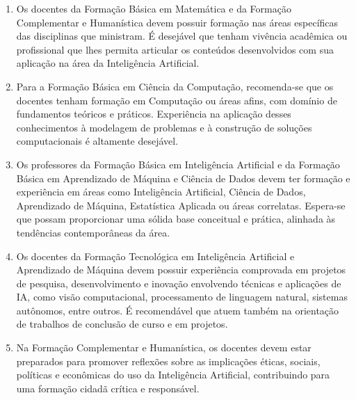 \begin{enumerate}
    \item Os docentes da Formação Básica em Matemática e da Formação Complementar e Humanística devem possuir formação nas áreas específicas das disciplinas que ministram. É desejável que tenham vivência acadêmica ou profissional que lhes permita articular os conteúdos desenvolvidos com sua aplicação na área da Inteligência Artificial.

    \item Para a Formação Básica em Ciência da Computação, recomenda-se que os docentes tenham formação em Computação ou áreas afins, com domínio de fundamentos teóricos e práticos. Experiência na aplicação desses conhecimentos à modelagem de problemas e à construção de soluções computacionais é altamente desejável.

    \item Os professores da Formação Básica em Inteligência Artificial e da Formação Básica em Aprendizado de Máquina e Ciência de Dados devem ter formação e experiência em áreas como Inteligência Artificial, Ciência de Dados, Aprendizado de Máquina, Estatística Aplicada ou áreas correlatas. Espera-se que possam proporcionar uma sólida base conceitual e prática, alinhada às tendências contemporâneas da área.

    \item Os docentes da Formação Tecnológica em Inteligência Artificial e Aprendizado de Máquina devem possuir experiência comprovada em projetos de pesquisa, desenvolvimento e inovação envolvendo técnicas e aplicações de IA, como visão computacional, processamento de linguagem natural, sistemas autônomos, entre outros. É recomendável que atuem também na orientação de trabalhos de conclusão de curso e em projetos.

    \item Na Formação Complementar e Humanística, os docentes devem estar preparados para promover reflexões sobre as implicações éticas, sociais, políticas e econômicas do uso da Inteligência Artificial, contribuindo para uma formação cidadã crítica e responsável. %

\end{enumerate}


